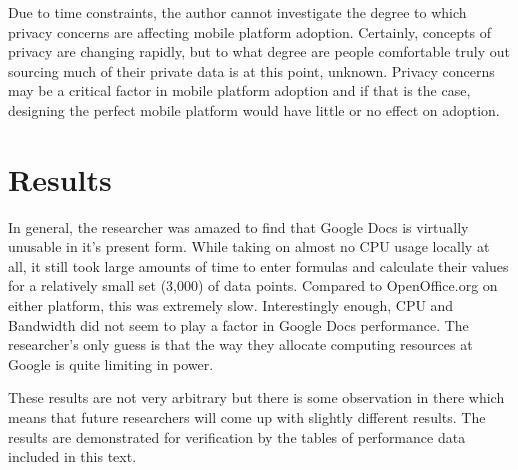 \documentclass[12pt,oneside,letterpaper,titlepage]{article}
\begin{document}
Due to time constraints, the author cannot investigate the degree to which
privacy concerns are affecting mobile platform adoption.  Certainly, concepts of
privacy are changing rapidly, but to what degree are people comfortable truly
out sourcing much of their private data is at this point, unknown.  Privacy
concerns may be a critical factor in mobile platform adoption and if that is the
case, designing the perfect mobile platform would have little or no effect on
adoption.

\section{Results}

In general, the researcher was amazed to find that Google Docs is virtually
unusable in it's present form.  While taking on almost no CPU usage locally at
all, it still took large amounts of time to enter formulas and calculate their
values for a relatively small set (3,000) of data points.  Compared to
OpenOffice.org on either platform, this was extremely slow.  Interestingly
enough, CPU and Bandwidth did not seem to play a factor in Google Docs
performance.  The researcher's only guess is that the way they allocate
computing resources at Google is quite limiting in power.

These results are not very arbitrary but there is some observation in there
which means that future researchers will come up with slightly different
results.  The results are demonstrated for verification by the tables of
performance data included in this text.
\end{document}
